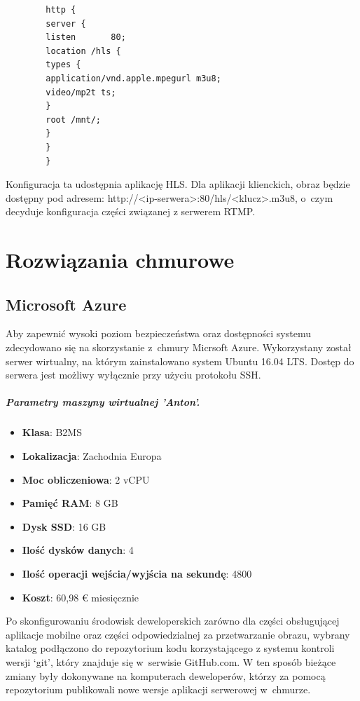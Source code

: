 \documentclass[polish,bachelor,a4paper,oneside]{ppfcmthesis}
\begin{document}
    \begin{verbatim}
        http {
        server {
        listen       80;
        location /hls {
        types {
        application/vnd.apple.mpegurl m3u8;
        video/mp2t ts;
        }
        root /mnt/;
        }
        }
        }
    \end{verbatim}

    Konfiguracja ta udostępnia aplikację HLS. Dla aplikacji klienckich, obraz będzie dostępny pod adresem: http://<ip-serwera>:80/hls/<klucz>.m3u8, o~czym decyduje konfiguracja części związanej z serwerem RTMP.


    \chapter{Rozwiązania chmurowe}

    \section{Microsoft Azure}

    Aby zapewnić wysoki poziom bezpieczeństwa oraz dostępności systemu zdecydowano się na skorzystanie z~chmury Micrsoft Azure.
    Wykorzystany został serwer wirtualny, na którym zainstalowano system Ubuntu 16.04 LTS. Dostęp do serwera jest możliwy wyłącznie przy użyciu protokołu SSH.

    \paragraph{Parametry maszyny wirtualnej 'Anton'.}
    \begin{itemize}
        \item \textbf{Klasa}: B2MS
        \item \textbf{Lokalizacja}: Zachodnia Europa
        \item \textbf{Moc obliczeniowa}: 2 vCPU
        \item \textbf{Pamięć RAM}: 8 GB
        \item \textbf{Dysk SSD}: 16 GB
        \item \textbf{Ilość dysków danych}: 4
        \item \textbf{Ilość operacji wejścia/wyjścia na sekundę}: 4800
        \item \textbf{Koszt}: 60,98 € miesięcznie
    \end{itemize}

    Po skonfigurowaniu środowisk deweloperskich zarówno dla części obsługującej aplikacje mobilne oraz części odpowiedzialnej za przetwarzanie obrazu, wybrany katalog podłączono do repozytorium kodu korzystającego z systemu kontroli wersji `git', który znajduje się w~serwisie GitHub.com.
    W ten sposób bieżące zmiany były dokonywane na komputerach deweloperów, którzy za pomocą repozytorium publikowali nowe wersje aplikacji serwerowej w~chmurze.
\end{document}
